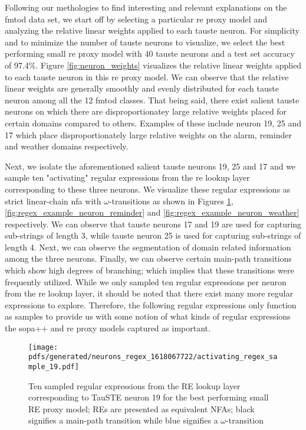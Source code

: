 Following our methologies to find interesting and relevant explanations on the
\ac{fmtod} data set, we start off by selecting a particular \ac{re} proxy model and
analyzing the relative linear weights applied to each \ac{tauste} neuron. For
simplicity and to minimize the number of \ac{tauste} neurons to visualize, we select
the best performing small \ac{re} proxy model with 40 \ac{tauste} neurons and a test set
accuracy of 97.4$\%$. Figure \ref{fig:neuron_weights} visualizes the relative
linear weights applied to each \ac{tauste} neuron in this \ac{re} proxy model. We can
observe that the relative linear weights are generally smoothly and evenly
distributed for each \ac{tauste} neuron among all the 12 \ac{fmtod} classes. That being
said, there exist salient \ac{tauste} neurons on which there are disproportionatey
large relative weights placed for certain domains compared to others. Examples
of these include neuron 19, 25 and 17 which place disproportionately large
relative weights on the alarm, reminder and weather domains respectively.

Next, we isolate the aforementioned salient \ac{tauste} neurons 19, 25 and 17 and we
sample ten "activating" regular expressions from the \ac{re} lookup layer
corresponding to these three neurons. We visualize these regular expressions as
strict linear-chain \ac{nfa} with $\omega$-transitions as shown in Figures
\ref{fig:regex_example_neuron_alarm}, \ref{fig:regex_example_neuron_reminder}
and \ref{fig:regex_example_neuron_weather} respectively. We can observe that
\ac{tauste} neurons 17 and 19 are used for capturing sub-strings of length 3, while
\ac{tauste} neuron 25 is used for capturing sub-strings of length 4. Next, we can
observe the segmentation of domain related information among the three neurons.
Finally, we can observe certain main-path transitions which show high degrees of
branching; which implies that these transitions were frequently utilized. While
we only sampled ten regular expressions per neuron from the \ac{re} lookup layer, it
should be noted that there exist many more regular expressions to explore.
Therefore, the following regular expressions only function as samples to provide
us with some notion of what kinds of regular expressions the \ac{sopa}++ and \ac{re} proxy
models captured as important.

\newpage

\begin{figure}[t!]
  \centering \texttt{[image: pdfs/generated/neurons\_regex\_1618067722/activating\_regex\_sample\_19.pdf]}
  \caption[Ten sampled regular expressions from the RE lookup layer
  corresponding to TauSTE neuron 19 for the best performing small RE proxy
  model]{Ten sampled regular expressions from the RE lookup layer
    corresponding to TauSTE neuron 19 for the best performing small RE proxy
    model; REs are presented as equivalent NFAs; black signifies a
    main-path transition while blue signifies a $\omega$-transition}
  \label{fig:regex_example_neuron_alarm}
\end{figure}

